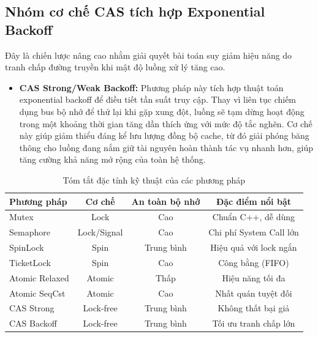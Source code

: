 \subsection{Nhóm cơ chế CAS tích hợp Exponential Backoff}

Đây là chiến lược nâng cao nhằm giải quyết bài toán suy giảm hiệu năng do tranh chấp đường truyền khi mật độ luồng xử lý tăng cao.

\begin{itemize}
    \item \textbf{CAS Strong/Weak Backoff:} 
    Phương pháp này tích hợp thuật toán exponential backoff để điều tiết tần suất truy cập. Thay vì liên tục chiếm dụng bus bộ nhớ để thử lại khi gặp xung đột, luồng sẽ tạm dừng hoạt động trong một khoảng thời gian tăng dần thích ứng với mức độ tắc nghẽn. Cơ chế này giúp giảm thiểu đáng kể lưu lượng đồng bộ cache, từ đó giải phóng băng thông cho luồng đang nắm giữ tài nguyên hoàn thành tác vụ nhanh hơn, giúp tăng cường khả năng mở rộng của toàn hệ thống.
\end{itemize}






\begin{table}[H!]
\centering
\caption{Tóm tắt đặc tính kỹ thuật của các phương pháp}
\begin{tabular}{|l|c|c|c|}
\hline
\textbf{Phương pháp} & \textbf{Cơ chế} & \textbf{An toàn bộ nhớ} & \textbf{Đặc điểm nổi bật} \\ \hline
Mutex & Lock & Cao & Chuẩn C++, dễ dùng \\ \hline
Semaphore & Lock/Signal & Cao & Chi phí System Call lớn \\ \hline  %
SpinLock & Spin & Trung bình & Hiệu quả với lock ngắn \\ \hline
TicketLock & Spin & Cao & Công bằng (FIFO) \\ \hline
Atomic Relaxed & Atomic & Thấp & Hiệu năng tối đa \\ \hline
Atomic SeqCst & Atomic & Cao & Nhất quán tuyệt đối \\ \hline
CAS Strong & Lock-free & Trung bình & Không thất bại giả \\ \hline
CAS Backoff & Lock-free & Trung bình & Tối ưu tranh chấp lớn \\ \hline
\end{tabular}
\end{table}